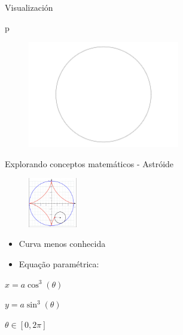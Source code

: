 \documentclass[
  ignorenonframetext,
]{beamer}
\newenvironment{Shaded}{\begin{snugshade}}{\end{snugshade}}
\newcommand{\NormalTok}[1]{\textcolor[rgb]{0.00,0.23,0.31}{#1}}
\begin{document}
\begin{frame}[fragile]{Visualización}
\protect\hypertarget{visualizaciuxf3n}{}
\begin{Shaded}
\begin{Highlighting}[]
\NormalTok{p}
\end{Highlighting}
\end{Shaded}

\begin{figure}

{\centering \includegraphics[width=2.60417in,height=\textheight]{Teste_quarto_files/figure-beamer/unnamed-chunk-10-1.pdf}

}

\end{figure}
\end{frame}

\begin{frame}{Explorando conceptos matemáticos - Astróide}
\protect\hypertarget{explorando-conceptos-matemuxe1ticos---astruxf3ide}{}
\begin{figure}

{\centering \includegraphics[width=0.83333in,height=\textheight]{FigurasLatinR2023/astroide_circle.png}

}

\end{figure}

\begin{itemize}
\item
  Curva menos conhecida
\item
  Equação paramétrica:
\end{itemize}

\(x=a\cos^3(\theta)\)

\(y=a\sin^3(\theta)\)

\(\theta\in [0,2\pi]\)
\end{frame}
\end{document}
